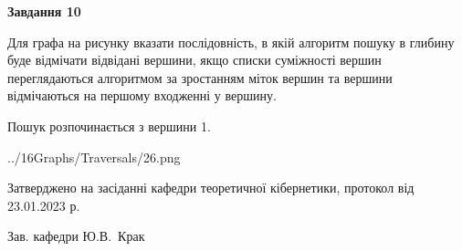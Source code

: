 \documentclass[12pt, ukrainian]{article}
\begin{document}
{\begin {large}
{\begin {center}\textbf{Завдання 10}\end {center}}\par
Для графа на рисунку вказати послідовність, в якій алгоритм пошуку в глибину буде відмічати відвідані вершини, якщо списки суміжності вершин переглядаються алгоритмом за зростанням міток вершин та вершини відмічаються на першому вход\-женні у вершину.\par
Пошук розпочинається з вершини 1.\par

\begin{center}
	{../16Graphs/Traversals/26.png}
\end{center}\par
\newpage


\end {large}
}
{\smallskip \begin {small} Затверджено на засіданні кафедри теоретичної кібернетики, протокол  від   23.01.2023 р.\par\smallskip\smallskip
{\parbox {6.5 cm}{Зав. кафедри \dotfill Ю.В.~Крак}} \end{small}}
\end{document}
